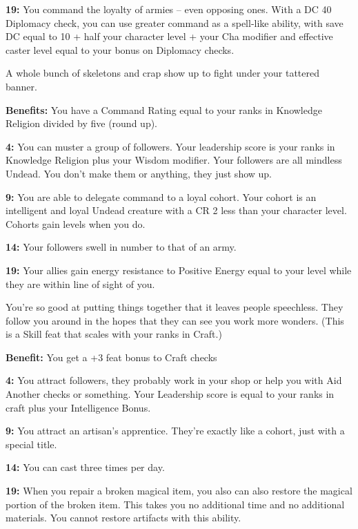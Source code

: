 \textbf{19:} You command the loyalty of armies -- even opposing ones. With a DC 40 Diplomacy check, you can use greater command as a spell-like ability, with save DC equal to 10 + half your character level + your Cha modifier and effective caster level equal to your bonus on Diplomacy checks.


A whole bunch of skeletons and crap show up to fight under your tattered banner.

\textbf{Benefits:} You have a Command Rating equal to your ranks in Knowledge Religion divided by five (round up).

\textbf{4:} You can muster a group of followers. Your leadership score is your ranks in Knowledge Religion plus your Wisdom modifier. Your followers are all mindless Undead. You don't make them or anything, they just show up.

\textbf{9:} You are able to delegate command to a loyal cohort. Your cohort is an intelligent and loyal Undead creature with a CR 2 less than your character level. Cohorts gain levels when you do.

\textbf{14:} Your followers swell in number to that of an army.

\textbf{19:} Your allies gain energy resistance to Positive Energy equal to your level while they are within line of sight of you.


You're so good at putting things together that it leaves people speechless. They follow you around in the hopes that they can see you work more wonders. (This is a Skill feat that scales with your ranks in Craft.)

\textbf{Benefit:} You get a +3 feat bonus to Craft checks

\textbf{4:} You attract followers, they probably work in your shop or help you with Aid Another checks or something. Your Leadership score is equal to your ranks in craft plus your Intelligence Bonus.

\textbf{9:} You attract an artisan's apprentice. They're exactly like a cohort, just with a special title.

\textbf{14:} You can cast  three times per day.

\textbf{19:} When you repair a broken magical item, you also can also restore the magical portion of the broken item. This takes you no additional time and no additional materials. You cannot restore artifacts with this ability.

